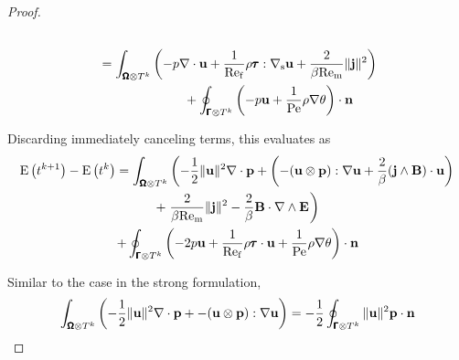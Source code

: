 \begin{proof}
\begin{align}
\begin{split}
            \end{split}  \\
            \begin{split}
                &=  \int_{\pmb{\mathsf{\Omega}}\otimes T^{k}}\left(- p\nabla\cdot\mathbf{u} + \frac{1}{\mathrm{Re}_{\mathrm{f}}}\rho\pmb{\mathsf{\tau}}:\nabla_{\mathrm{s}}\mathbf{u} + \frac{2}{\beta\mathrm{Re}_{\mathrm{m}}}\|\mathbf{j}\|^{2}\right)  \\
                &\;\;\;\;\;\;\;\;\;\;\;\;\;\;\;\;\;\;\;\;\;\;\;\;+ \oint_{\pmb{\mathsf{\Gamma}}\otimes T^{k}}\left(- p\mathbf{u} + \frac{1}{\mathrm{Pe}}\rho\nabla\theta\right)\cdot\mathbf{n}
            \end{split}
        \end{align}

        Discarding immediately canceling terms, this evaluates as
        \begin{multline}
            \rmE\left(t^{k + 1}\right) - \rmE\left(t^{k}\right)  =  \int_{\bfOmega\otimes T^{k}}\left( - \frac{1}{2}\|\bfu\|^{2}\nabla\cdot\bfp + \left(- (\bfu\otimes\bfp):\nabla\bfu + \frac{2}{\beta}(\bfj\wedge\bfB)\cdot\bfu\right)\right.  \\
            + \left.\frac{2}{\beta\rmRem}\|\bfj\|^{2} - \frac{2}{\beta}\bfB\cdot\nabla\wedge\bfE\tall\right)  \\
            + \oint_{\bfGamma\otimes T^{k}}\left(- 2p\bfu + \frac{1}{\rmRef}\rho\bftau\cdot\bfu + \frac{1}{\rmPe}\rho\nabla\theta\right)\cdot\bfn
        \end{multline}
        
        Similar to the case in the strong formulation,
        \begin{equation}
            \int_{\pmb{\mathsf{\Omega}}\otimes T^{k}}\left( - \frac{1}{2}\|\mathbf{u}\|^{2}\nabla\cdot\mathbf{p} + - (\mathbf{u}\otimes\mathbf{p}):\nabla\mathbf{u}\right)  =  - \frac{1}{2}\oint_{\pmb{\mathsf{\Gamma}}\otimes T^{k}}\|\mathbf{u}\|^{2}\mathbf{p}\cdot\mathbf{n}
        \end{equation}
        

\end{proof}
